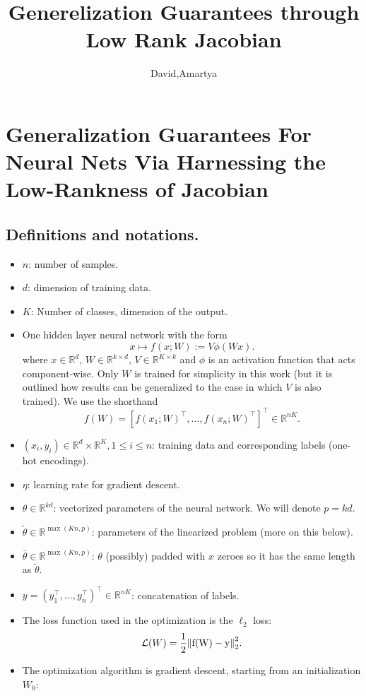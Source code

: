 \documentclass[a4paper]{article}
\title{Generelization Guarantees through Low Rank  Jacobian}
\author{David,Amartya}
\date{}
\newcommand{\R}{\mathbb{R}}
\begin{document}
\maketitle


\section{Generalization Guarantees For Neural Nets Via Harnessing the Low-Rankness of Jacobian}


\subsection*{Definitions and notations.}
\begin{itemize}
\item $n$: number of samples.
\item $d$: dimension of training data.
\item $K$: Number of classes, dimension of the output.
\item One hidden layer neural network with the form
    \[
    x \mapsto f(x ; W):= V \phi(W x).
    \] 
    where $x\in\R^d$, $W\in \R^{k\times d}$, $V\in \R^{K\times k}$ and $\phi$ is an activation function that acts component-wise. Only $W$ is trained for simplicity in this work (but it is outlined how results can be generalized to the case in which $V$ is also trained). We use the shorthand
    \[
        f(W) = [f(x_1;W)^\top, \dots, f(x_n;W)^\top]^\top \in \R^{nK}.
    \] 
\item $(x_i, y_i) \in \R^d\times\R^K, 1\leq i\leq n$: training data and corresponding labels (one-hot encodings). 
\item $\eta$: learning rate for gradient descent.
\item $\theta \in \R^{kd}$: vectorized parameters of the neural network. We will denote $p=kd$.
\item $\tilde{\theta} \in \R^{\max(Kn,p)}$: parameters of the linearized problem (more on this below).
\item $\bar{\theta} \in \R^{\max(Kn,p)}$: $\theta$ (possibly) padded with $x$ zeroes so it has the same length as $\tilde{\theta}$.
\item $y = (y_1^\top,\dots, y_n^\top)^\top \in \R^{nK}$: concatenation of labels.
\item The loss function used in the optimization is the $\ell_2$ loss:
    \[
        \mathcal{L}(W) = \frac{1}{2} \mathrm{\left\lVert f(W)-y\right\rVert}_2^2.
    \] 
\item The optimization algorithm is gradient descent, starting from an initialization $W_0$:

\end{itemize}
\end{document}
